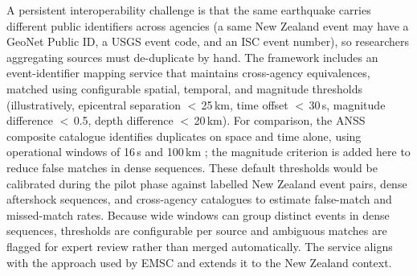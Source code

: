 \documentclass[11pt]{article}
\begin{document}
A persistent interoperability challenge is that the same earthquake carries different public identifiers across agencies (a same New Zealand event may have a GeoNet Public ID, a USGS event code, and an ISC event number), so researchers aggregating sources must de-duplicate by hand. The framework includes an event-identifier mapping service that maintains cross-agency equivalences, matched using configurable spatial, temporal, and magnitude thresholds (illustratively, epicentral separation $<$\,25\,km, time offset $<$\,30\,s, magnitude difference $<$\,0.5, depth difference $<$\,20\,km). For comparison, the ANSS composite catalogue identifies duplicates on space and time alone, using operational windows of 16\,s and 100\,km \citep{NCEDCComCat}; the magnitude criterion is added here to reduce false matches in dense sequences. These default thresholds would be calibrated during the pilot phase against labelled New Zealand event pairs, dense aftershock sequences, and cross-agency catalogues to estimate false-match and missed-match rates. Because wide windows can group distinct events in dense sequences, thresholds are configurable per source and ambiguous matches are flagged for expert review rather than merged automatically. The service aligns with the approach used by EMSC \citep{emsc_webservices} and extends it to the New Zealand context.
\end{document}
